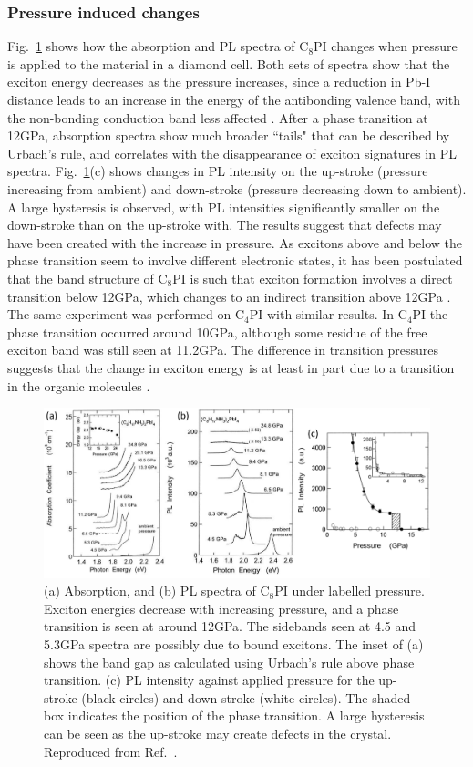 \subsubsection{Pressure induced changes}
Fig.\ \ref{2Fig18} shows how the absorption and PL spectra of $\textrm{C}_8$PI changes when pressure is applied to the material in a diamond cell. Both sets of spectra show that the exciton energy decreases as the pressure increases, since a reduction in Pb-I distance leads to an increase in the energy of the antibonding valence band, with the non-bonding conduction band less affected \cite{Matsuishi2004}. After a phase transition at 12GPa, absorption spectra show much broader ``tails" that can be described by Urbach's rule, and correlates with the disappearance of exciton signatures in PL spectra. Fig.\ \ref{2Fig18}(c) shows changes in PL intensity on the up-stroke (pressure increasing from ambient) and down-stroke (pressure decreasing down to ambient). A large hysteresis is observed, with PL intensities significantly smaller on the down-stroke than on the up-stroke with. The results suggest that defects may have been created with the increase in pressure. As excitons above and below the phase transition seem to involve different electronic states, it has been postulated that the band structure of $\textrm{C}_8$PI is such that exciton formation involves a direct transition below 12GPa, which changes to an indirect transition above 12GPa \cite{Matsuishi2001}. The same experiment was performed on $\textrm{C}_4$PI with similar results. In $\textrm{C}_4$PI the phase transition occurred around 10GPa, although some residue of the free exciton band was still seen at 11.2GPa. The difference in transition pressures suggests that the change in exciton energy is at least in part due to a transition in the organic molecules \cite{Matsuishi2004}.
\begin{figure}[h!]
\centering
\includegraphics[width=\textwidth]{Fig18}
\caption{(a) Absorption, and (b) PL spectra of $\textrm{C}_8$PI under labelled pressure. Exciton energies decrease with increasing pressure, and a phase transition is seen at around 12GPa. The sidebands seen at 4.5 and 5.3GPa spectra are possibly due to bound excitons. The inset of (a) shows the band gap as calculated using Urbach's rule above phase transition.  (c) PL intensity against applied pressure for the up-stroke (black circles) and down-stroke (white circles). The shaded box indicates the position of the phase transition. A large hysteresis can be seen as the up-stroke may create defects in the crystal. Reproduced from Ref.\ \cite{Matsuishi2001}.}
\label{2Fig18}
\end{figure}


